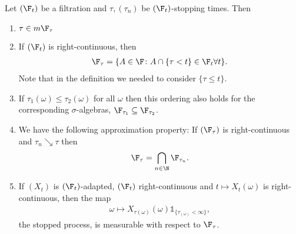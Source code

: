 \begin{prop}
Let $(\F_t)$ be a filtration and $\tau,(\tau_n)$ be $(\F_t)$-stopping times. Then
\begin{enumerate}[label=\alph*)]
\item $\tau \in m \F_\tau$
\item If $(\F_t)$ is right-continuous, then
\begin{align*}
\F_\tau=\{A \in \F \colon A\cap \{\tau<t\}\in \F_t \forall t\}.
\end{align*}
Note that in the definition we needed to consider $\{\tau\leq t\}$.
\item If $\tau_1(\omega)\leq \tau_2(\omega)$ for all $\omega$ then this ordering also holds for the corresponding $\sigma$-algebras, \ie $\F_{\tau_1}\subseteq \F_{\tau_2}$.
\item We have the following approximation property: If $(\F_\tau)$ is right-continuous and $\tau_n \searrow \tau$ then
\begin{align*}
\F_\tau=\bigcap_{n\in \N} \F_{\tau_n}.
\end{align*}
\item If $(X_t)$ is $(\F_t)$-adapted, $(\F_t)$ right-continuous and $t \mapsto X_t(\omega)$ is right-continuous, then the map
\begin{align*}
\omega \mapsto X_{\tau(\omega)}(\omega) \mathds{1}_{\{\tau_(\omega)<\infty\}},
\end{align*}
\ie the stopped process, is measurable with respect to $\F_\tau$.
\end{enumerate}
\end{prop}
